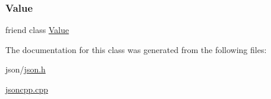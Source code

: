 \subsubsection{\texorpdfstring{Value}{Value}}
{\footnotesize\ttfamily friend class \hyperlink{classJson_1_1Value}{Value}\hspace{0.3cm}{\ttfamily [friend]}}



The documentation for this class was generated from the following files\+:\begin{DoxyCompactItemize}
\item 
json/\hyperlink{json_8h}{json.\+h}\item 
\hyperlink{jsoncpp_8cpp}{jsoncpp.\+cpp}\end{DoxyCompactItemize}
